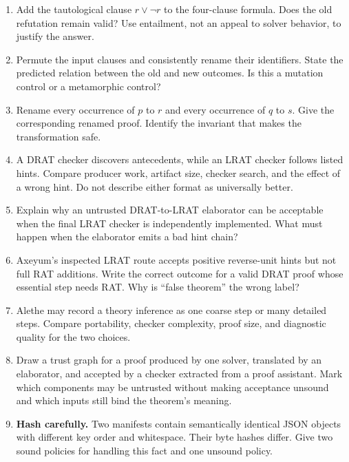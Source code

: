 \begin{enumerate}
\item Add the tautological clause \(r\lor\neg r\) to the four-clause formula.
Does the old refutation remain valid? Use entailment, not an appeal to solver
behavior, to justify the answer.

\item Permute the input clauses and consistently rename their identifiers.
State the predicted relation between the old and new outcomes. Is this a
mutation control or a metamorphic control?

\item Rename every occurrence of \(p\) to \(r\) and every occurrence of
\(q\) to \(s\). Give the corresponding renamed proof. Identify the invariant
that makes the transformation safe.

\item A DRAT checker discovers antecedents, while an LRAT checker follows
listed hints. Compare producer work, artifact size, checker search, and the
effect of a wrong hint. Do not describe either format as universally better.

\item Explain why an untrusted DRAT-to-LRAT elaborator can be acceptable when
the final LRAT checker is independently implemented. What must happen when the
elaborator emits a bad hint chain?

\item Axeyum's inspected LRAT route accepts positive reverse-unit hints but not
full RAT additions. Write the correct outcome for a valid DRAT proof whose
essential step needs RAT. Why is ``false theorem'' the wrong label?

\item Alethe may record a theory inference as one coarse step or many detailed
steps. Compare portability, checker complexity, proof size, and diagnostic
quality for the two choices.

\item Draw a trust graph for a proof produced by one solver, translated by an
elaborator, and accepted by a checker extracted from a proof assistant. Mark
which components may be untrusted without making acceptance unsound and which
inputs still bind the theorem's meaning.

\item \textbf{Hash carefully.} Two manifests contain semantically identical
JSON objects with different key order and whitespace. Their byte hashes
differ. Give two sound policies for handling this fact and one unsound policy.


\end{enumerate}
